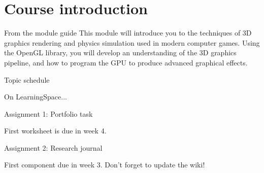 \part{Course introduction}
\frame{\partpage}

\begin{frame}{From the module guide}
This module will introduce you to the techniques of 3D graphics rendering and physics simulation used in modern computer games. Using the OpenGL library, you will develop an understanding of the 3D graphics pipeline, and how to program the GPU to produce advanced graphical effects.
\end{frame}

\begin{frame}{Topic schedule}
	\begin{center}
		On LearningSpace...
	\end{center}
\end{frame}

\begin{frame}{Assignment 1: Portfolio task}
	\begin{center}
		First worksheet is due in week 4.
	\end{center}
\end{frame}

\begin{frame}{Assignment 2: Research journal}
	\begin{center}
		First component due in week 3.
		\pause Don't forget to update the wiki!
	\end{center}
\end{frame}

